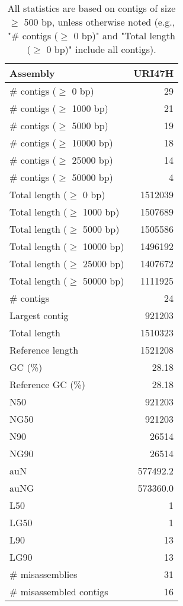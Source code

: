 \documentclass[12pt,a4paper]{article}
\begin{document}
\begin{table}[ht]
\begin{center}
\caption{All statistics are based on contigs of size $\geq$ 500 bp, unless otherwise noted (e.g., "\# contigs ($\geq$ 0 bp)" and "Total length ($\geq$ 0 bp)" include all contigs).}
\begin{tabular}{|l*{1}{|r}|}
\hline
Assembly & URI47H \\ \hline
\# contigs ($\geq$ 0 bp) & 29 \\ \hline
\# contigs ($\geq$ 1000 bp) & 21 \\ \hline
\# contigs ($\geq$ 5000 bp) & 19 \\ \hline
\# contigs ($\geq$ 10000 bp) & 18 \\ \hline
\# contigs ($\geq$ 25000 bp) & 14 \\ \hline
\# contigs ($\geq$ 50000 bp) & 4 \\ \hline
Total length ($\geq$ 0 bp) & 1512039 \\ \hline
Total length ($\geq$ 1000 bp) & 1507689 \\ \hline
Total length ($\geq$ 5000 bp) & 1505586 \\ \hline
Total length ($\geq$ 10000 bp) & 1496192 \\ \hline
Total length ($\geq$ 25000 bp) & 1407672 \\ \hline
Total length ($\geq$ 50000 bp) & 1111925 \\ \hline
\# contigs & 24 \\ \hline
Largest contig & 921203 \\ \hline
Total length & 1510323 \\ \hline
Reference length & 1521208 \\ \hline
GC (\%) & 28.18 \\ \hline
Reference GC (\%) & 28.18 \\ \hline
N50 & 921203 \\ \hline
NG50 & 921203 \\ \hline
N90 & 26514 \\ \hline
NG90 & 26514 \\ \hline
auN & 577492.2 \\ \hline
auNG & 573360.0 \\ \hline
L50 & 1 \\ \hline
LG50 & 1 \\ \hline
L90 & 13 \\ \hline
LG90 & 13 \\ \hline
\# misassemblies & 31 \\ \hline
\# misassembled contigs & 16 \\ \hline

\end{tabular}
\end{center}
\end{table}
\end{document}
